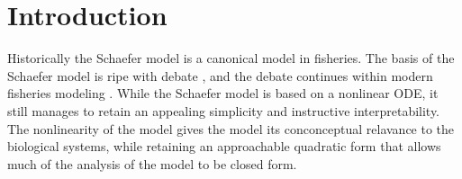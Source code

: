%
\section{Introduction\label{ptInt}}


%
Historically the Schaefer model is a canonical model in fisheries. %
The basis of the Schaefer model is ripe with debate \cite{kingsland_refractory_1982},
and the debate continues within modern fisheries modeling \cite{prager_comparison_2002, maunder_is_2003, prager_reply_2003}.
While the Schaefer model is based on a nonlinear ODE, it still manages to retain 
an appealing simplicity and instructive interpretability. %
The nonlinearity of the model gives the model its conconceptual relavance to the 
biological systems, while retaining an approachable quadratic form that allows 
much of the analysis of the model to be closed form.  


